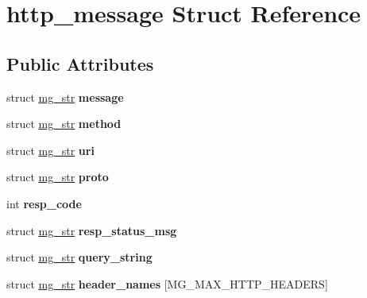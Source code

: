 \hypertarget{structhttp__message}{}\section{http\+\_\+message Struct Reference}
\label{structhttp__message}
\subsection*{Public Attributes}
\begin{DoxyCompactItemize}
\item 
struct \hyperlink{structmg__str}{mg\+\_\+str} {\bfseries message}\hypertarget{structhttp__message_a005f4310b3d6f7f2c818e4dff1c81d10}{}\label{structhttp__message_a005f4310b3d6f7f2c818e4dff1c81d10}

\item 
struct \hyperlink{structmg__str}{mg\+\_\+str} {\bfseries method}\hypertarget{structhttp__message_a446deffe0f2da170fb9216fd5c8812d2}{}\label{structhttp__message_a446deffe0f2da170fb9216fd5c8812d2}

\item 
struct \hyperlink{structmg__str}{mg\+\_\+str} {\bfseries uri}\hypertarget{structhttp__message_a2f8d9e674965443571fd6e581393dd62}{}\label{structhttp__message_a2f8d9e674965443571fd6e581393dd62}

\item 
struct \hyperlink{structmg__str}{mg\+\_\+str} {\bfseries proto}\hypertarget{structhttp__message_aafd1525884e7c83d781d86c063ec1f4f}{}\label{structhttp__message_aafd1525884e7c83d781d86c063ec1f4f}

\item 
int {\bfseries resp\+\_\+code}\hypertarget{structhttp__message_a1c4e12c873f1e4d9711d470e2e32fa65}{}\label{structhttp__message_a1c4e12c873f1e4d9711d470e2e32fa65}

\item 
struct \hyperlink{structmg__str}{mg\+\_\+str} {\bfseries resp\+\_\+status\+\_\+msg}\hypertarget{structhttp__message_ae819bf6100f781e15515c01bf03f5a76}{}\label{structhttp__message_ae819bf6100f781e15515c01bf03f5a76}

\item 
struct \hyperlink{structmg__str}{mg\+\_\+str} {\bfseries query\+\_\+string}\hypertarget{structhttp__message_a899c4cefcdda3ba4fbafcfb05a85bba5}{}\label{structhttp__message_a899c4cefcdda3ba4fbafcfb05a85bba5}

\item 
struct \hyperlink{structmg__str}{mg\+\_\+str} {\bfseries header\+\_\+names} \mbox{[}M\+G\+\_\+\+M\+A\+X\+\_\+\+H\+T\+T\+P\+\_\+\+H\+E\+A\+D\+E\+RS\mbox{]}\hypertarget{structhttp__message_ad0a1f9898353bfcc80ab7f2f0a22adb0}{}\label{structhttp__message_ad0a1f9898353bfcc80ab7f2f0a22adb0}


\end{DoxyCompactItemize}
